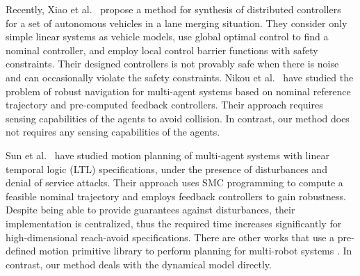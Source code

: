 \begin{enumerate}[(1)]
Recently, Xiao et al.\ \cite{xiao2019merging} propose a method for synthesis of distributed controllers for a 
set of autonomous vehicles in a lane merging situation. They consider only simple linear systems as vehicle models, use global optimal control to find a nominal controller, and employ local control barrier functions with safety constraints.
Their designed controllers is not provably safe when there is noise and can occasionally violate the safety constraints.
Nikou et al.\ \cite{Nikou2019} have studied the problem of robust navigation for multi-agent systems based on nominal reference trajectory and pre-computed feedback controllers. Their approach requires sensing capabilities of the agents to avoid collision. In contrast, our method does not requires any sensing capabilities of the agents.

Sun et al.\ \cite{sun2019} have studied motion planning of multi-agent systems with linear temporal logic (LTL) specifications, under the presence of disturbances and denial of service attacks.
Their approach uses SMC programming to compute a feasible nominal trajectory and employs feedback controllers to gain robustness.
Despite being able to provide guarantees against disturbances, their implementation is centralized, thus the required time increases significantly for high-dimensional reach-avoid specifications.%
%
There are other works that use a pre-defined motion primitive library to perform planning for multi-robot 
systems \cite{saha2016implan,BanusicMPSZ19pgcd,Gavran2017antlab,desai2017drona}. 
In contrast, our method deals with the dynamical model directly.


\end{enumerate}
